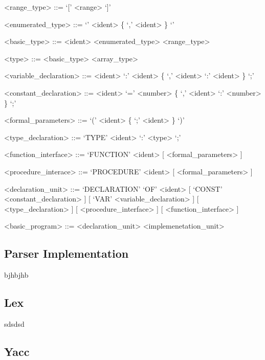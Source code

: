 \documentclass[]{article}
\begin{document}
\begin{grammar}
	<range_type> ::= `[' <range> `]'
	
	<enumerated_type> ::= `{' <ident> \{ `,' <ident> \} `}'
	
	<basic_type> ::= <ident> 
	\alt <enumerated_type>
	\alt <range_type>
	
	<type> ::= <basic_type>
	\alt <array_type>
	
	<variable_declaration> ::= <ident> `:' <ident> \{ `,' <ident> `:' <ident> \} `;'
	
	<constant_declaration> ::= <ident> `=' <number> \{ `,' <ident> `:' <number> \} `;'
	
	<formal_parameters> ::= `(' <ident> \{ `;' <ident> \} `)'
	
	<type_declaration> ::= `TYPE' <ident> `:' <type> `;'
	
	<function_interface> ::= `FUNCTION' <ident> [ <formal_parameters> ]
	
	<procedure_interace> ::= `PROCEDURE' <ident> [ <formal_parameters> ]
	
	<declaration_unit> ::= `DECLARATION' `OF' <ident>
    [ `CONST' <constant_declaration> ]
	[ `VAR' <variable_declaration> ]
	[ <type_declaration> ]
	[ <procedure_interface> ]
	[ <function_interface> ]
	
	<basic_program> ::= <declaration_unit> <implemenetation_unit>
	
\end{grammar}
\vspace{0.5cm}


\begin{center}
	\section*{Parser Implementation}
\end{center}
\vspace{0.5cm}

bjhbjhb

\vspace{0.5cm}
\subsection*{Lex}
\vspace{0.5cm}

sdsdsd

\vspace{0.5cm}
\subsection*{Yacc}
\vspace{0.5cm}
\end{document}
